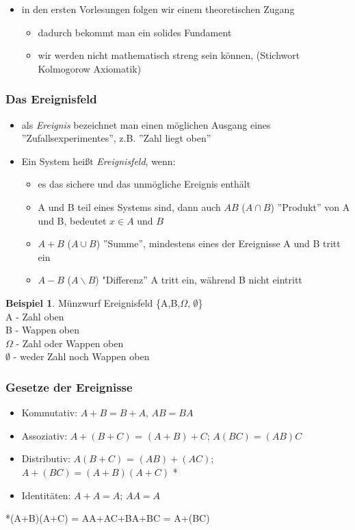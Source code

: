 \documentclass[10pt,a4paper]{article}
\theoremstyle{definition}
\newtheorem{exmp}{Beispiel}
\begin{document}
\begin{itemize}
	\item in den ersten Vorlesungen folgen wir einem theoretischen Zugang
	\begin{itemize}
		\item dadurch bekommt man ein solides Fundament
		\item wir werden nicht mathematisch streng sein können, (Stichwort Kolmogorow Axiomatik)
	\end{itemize}
\end{itemize}
\subsubsection{Das Ereignisfeld}
\begin{itemize}
	\item als \textit{Ereignis} bezeichnet man einen möglichen Ausgang eines ''Zufallsexperimentes'', z.B. ''Zahl liegt oben''
	\item Ein System heißt \textit{Ereignisfeld}, wenn:
	\begin{itemize}
		\item es das sichere und das unmögliche Ereignis enthält

				\item A und B teil eines Systems sind, dann auch $AB$ ($A\cap B$) ''Produkt'' von A und B, bedeutet $x \in A \text{ und } B$
			\item $A+B$ ($A \cup B$) ''Summe'', mindestens eines der Ereignisse A und B tritt ein
			\item $A-B$ ($A\backslash B$) "Differenz'' A tritt ein, während B nicht eintritt

	
	\end{itemize}
\end{itemize}
\begin{exmp}
	Münzwurf Ereignisfeld \{A,B,$\Omega$, $\emptyset$\}\\
	A - Zahl oben\\B - Wappen oben \\ $\Omega$ - Zahl oder Wappen oben \\ $\emptyset$ - weder Zahl noch Wappen oben
\end{exmp}

\subsubsection{Gesetze der Ereignisse}
\begin{itemize}
	\item Kommutativ: $A+B = B+A$, $AB = BA$
	\item Assoziativ: $A+(B+C)$ = $(A+B)+C$; $A(BC) = (AB)C$
	\item Distributiv: $A(B+C)$ = $(AB)+(AC)$; $A+(BC) = (A+B)(A+C)$ *
	\item Identitäten: $A+A = A$; $AA = A$
\end{itemize}
*(A+B)(A+C) = AA+AC+BA+BC = A+(BC)
\end{document}
